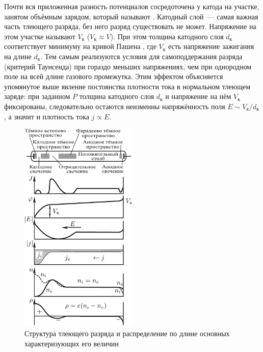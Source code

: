 Почти вся приложенная разность потенциалов сосредоточена у катода на участке,
занятом объёмным зарядом, который называют .
Катодный слой~--- самая важная часть тлеющего разряда,
без него разряд существовать не может.
Напряжение на этом участке называют
 $V_{к}$ ($V_{к} \approx V$).
При этом толщина катодного слоя $d_{к}$ соответствует минимуму на кривой
Пашена , где $V_{к}$ есть напряжение зажигания
на длине $d_{к}$. Тем самым реализуются условия для самоподдержания разряда
(критерий Таунсенда) при гораздо меньших напряжениях, чем при однородном поле
на всей длине газового промежутка.
Этим эффектом объясняется упомянутое выше явление постоянства плотности
тока в нормальном тлеющем заряде: при заданном $P$ толщина катодного
слоя $d_{к}$ и напряжение на нём $V_{к}$ фиксированы, следовательно
остаются неизменны напряжённость поля $E\sim V_{к}/d_{к}$, а значит
и плотность тока $j\propto E$.




\begin{figure}[h!]
	\centering
    \includegraphics[width=0.5\textwidth]{Images/Chapter_5/v5_7.pdf}
	\caption{Структура тлеющего разряда и распределение по длине основных характеризующих его величин}
\end{figure}

